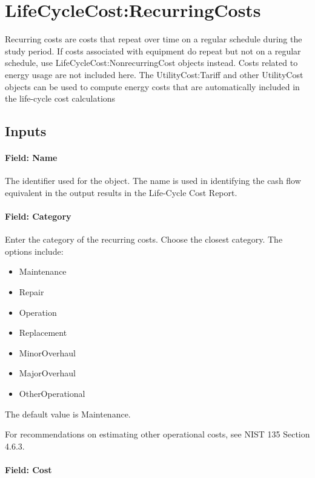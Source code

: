 \section{LifeCycleCost:RecurringCosts}\label{lifecyclecostrecurringcosts}

Recurring costs are costs that repeat over time on a regular schedule during the study period. If costs associated with equipment do repeat but not on a regular schedule, use LifeCycleCost:NonrecurringCost objects instead. Costs related to energy usage are not included here. The UtilityCost:Tariff and other UtilityCost objects can be used to compute energy costs that are automatically included in the life-cycle cost calculations

\subsection{Inputs}\label{inputs-059}

\paragraph{Field: Name}\label{field-name-057}

The identifier used for the object. The name is used in identifying the cash flow equivalent in the output results in the Life-Cycle Cost Report.

\paragraph{Field: Category}\label{field-category-000}

Enter the category of the recurring costs. Choose the closest category. The options include:

\begin{itemize}
\item
  Maintenance
\item
  Repair
\item
  Operation
\item
  Replacement
\item
  MinorOverhaul
\item
  MajorOverhaul
\item
  OtherOperational
\end{itemize}

The default value is Maintenance.

For recommendations on estimating other operational costs, see NIST 135 Section 4.6.3.

\paragraph{Field: Cost}\label{field-cost-000}

